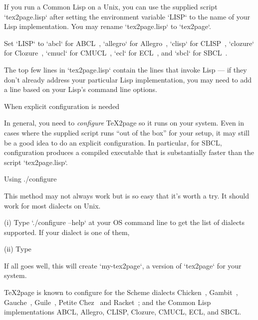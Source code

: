 If you run a Common Lisp on a Unix, you can use the supplied script
`tex2page.lisp` after setting the environment variable `LISP` to the
name of your Lisp implementation.  You may rename `tex2page.lisp` to
`tex2page`.

Set `LISP` to
`abcl` for ABCL~\cite{abcl},
`allegro` for Allegro~\cite{allegro},
`clisp` for CLISP~\cite{clisp},
`clozure` for Clozure~\cite{clozure},
`cmucl` for CMUCL~\cite{cmucl},
`ecl` for ECL~\cite{ecl},
and `sbcl` for SBCL~\cite{sbcl}.

The top few lines in `tex2page.lisp` contain the lines
that invoke Lisp —  if they don’t already address your
particular Lisp
implementation, you may need to add a line based on your
Lisp’s command line options.

\beginsection When explicit configuration is needed

%
In general, you need to {\em
configure}
\TeX2page so it runs on your system.  Even in cases where the supplied
script runs “out of the box” for your setup, it may still be a good
idea to do an explicit configuration.  In particular, for SBCL,
configuration produces a compiled executable that is substantially
faster than the script `tex2page.lisp`.

\beginsection Using {./configure}

This method may not always work but is so easy that
it’s worth a try.  It should work for most
dialects on Unix.

\item(i) Type `./configure --help` at your OS command line
to get the list of dialects supported.
If your dialect  is one of them,

\item(ii) Type  

\n If all goes well, this will create
`my-tex2page`, a version of `tex2page` for your
system.

\TeX2page is known to configure for the Scheme dialects
Chicken~\cite{chicken}, Gambit~\cite{gambit}, Gauche~\cite{gauche},
Guile~\cite{guile}, Petite
Chez~\cite{petite} and Racket~\cite{racket}; and the Common Lisp
implementations ABCL, Allegro, CLISP, Clozure, CMUCL, ECL, and SBCL.
\iffalse how about bigloo mitscheme pocketscheme s48 scm scsh
stklos sxm \fi

